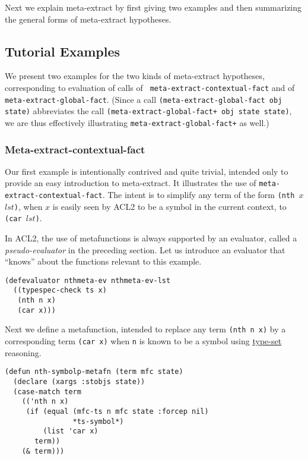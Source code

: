 Next we explain meta-extract by first giving two examples and then
summarizing the general forms of meta-extract hypotheses.

\subsection{Tutorial Examples}

We present two examples for the two kinds of meta-extract hypotheses,
corresponding to evaluation of calls of {\tt
  meta-extract-contextual-fact} and of {\tt meta-extract-global-fact}.
(Since a call {\tt (meta-extract-global-fact obj state)} abbreviates
the call {\tt (meta-extract-global-fact+ obj state state)}, we are
thus effectively illustrating {\tt meta-extract-global-fact+} as
well.)

\subsubsection{Meta-extract-contextual-fact}

Our first example is intentionally contrived and quite trivial,
intended only to provide an easy introduction to meta-extract.  It
illustrates the use of {\tt meta-extract-contextual-fact}.  The intent
is to simplify any term of the form {\tt (nth $x$ $lst$)}, when $x$ is
easily seen by ACL2 to be a symbol in the current context, to {\tt
  (car $lst$)}.

In ACL2, the use of metafunctions is always supported by an evaluator,
called a {\em pseudo-evaluator} in the preceding section.  Let us
introduce an evaluator that ``knows'' about the functions relevant to
this example.

\begin{verbatim}
(defevaluator nthmeta-ev nthmeta-ev-lst
  ((typespec-check ts x)
   (nth n x)
   (car x)))
\end{verbatim}

\noindent Next we define a metafunction, intended to replace any term
{\tt (nth n x)} by a corresponding term {\tt (car x)} when {\tt n} is
known to be a symbol using
\href{http://www.cs.utexas.edu/users/moore/acl2/manuals/current/manual/index.html?topic=ACL2\_\_\_\_TYPE-SET}{\underline{type-set}}
reasoning.

\begin{verbatim}
(defun nth-symbolp-metafn (term mfc state)
  (declare (xargs :stobjs state))
  (case-match term
    (('nth n x)
     (if (equal (mfc-ts n mfc state :forcep nil)
                *ts-symbol*)
         (list 'car x)
       term))
    (& term)))
\end{verbatim}

